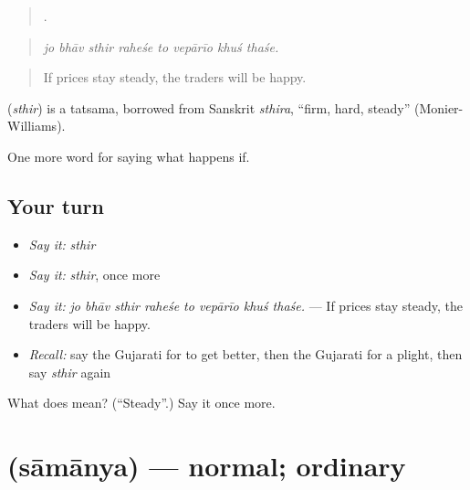 \begin{quote}
       .
\end{quote}

\begin{quote}
\emph{jo bhāv sthir raheśe to vepārīo khuś thaśe.}
\end{quote}

\begin{quote}
If prices stay steady, the traders will be happy.
\end{quote}

\begin{cousinweb}
\textbf{} (\emph{sthir}) is a tatsama, borrowed from Sanskrit \emph{sthira}, \textquotedblleft{}firm, hard, steady\textquotedblright{} (Monier-Williams).
\end{cousinweb}

\begin{grammarlens}[title={What you've built}]
One more word for saying what happens if.
\end{grammarlens}

\subsection*{Your turn}
\begin{itemize}
\raggedright
  \item \emph{Say it:} \emph{sthir}
  \item \emph{Say it:} \emph{sthir}, once more
  \item \emph{Say it:} \emph{jo bhāv sthir raheśe to vepārīo khuś thaśe.} — If prices stay steady, the traders will be happy.
  \item \emph{Recall:} say the Gujarati for to get better, then the Gujarati for a plight, then say \emph{sthir} again
\end{itemize}

\begin{tcolorbox}[breakable,colback=teal!4,colframe=teal!35!black,title={Before you move on}]
What does  mean? (\textquotedblleft{}Steady\textquotedblright{}.) Say it once more.
\end{tcolorbox}
\section[\texorpdfstring{\gu{સામાન્ય} (sāmānya)}{સામાન્ય (sāmānya)}]{ (sāmānya) — normal; ordinary}

